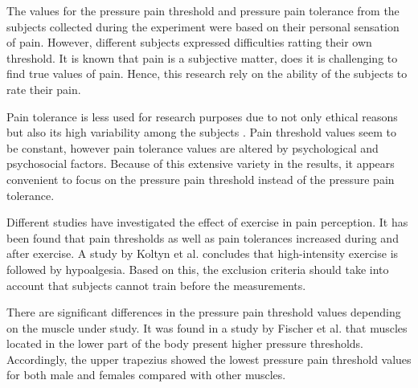 The values for the pressure pain threshold and pressure pain tolerance from the subjects collected during the experiment were based on their personal sensation of pain. However, different subjects expressed difficulties ratting their own threshold. It is known that pain is a subjective matter, does it is challenging to find true values of pain. Hence, this research rely on the ability of the subjects to rate their pain.

Pain tolerance is less used for research purposes due to not only  ethical reasons but also its high variability among the subjects \cite{Yarnitsky2006}. Pain threshold values seem to be constant, however pain tolerance values are altered by psychological and psychosocial factors. Because of this extensive variety in the results, it appears convenient to focus on the pressure pain threshold instead of the pressure pain tolerance. 

Different studies have investigated the effect of exercise in pain perception. It has been found that pain thresholds as well as pain tolerances increased during and after exercise.  A study by Koltyn et al. \cite{Koltyn2002} concludes that high-intensity exercise is followed by hypoalgesia. Based on this, the exclusion criteria should take into account that subjects cannot train before the measurements.

There are significant differences in the pressure pain threshold values depending on the  muscle under study. It was found in a study by Fischer et al. \cite{Fischer1987} that muscles located in the lower part of the body present  higher pressure thresholds. Accordingly, the upper trapezius showed the lowest pressure pain threshold values for both male and females compared with other muscles.

